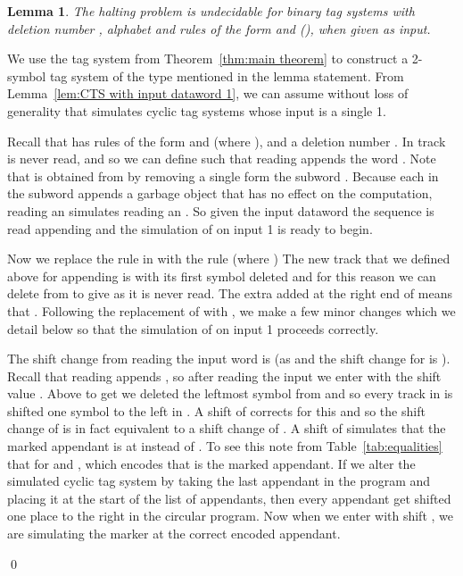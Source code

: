 \documentclass[11pt]{article} \usepackage{amsfonts,amsmath,amssymb,amsthm}
\renewenvironment{proof}{{\bfseries\noindent Proof.}}{\qed\vspace{3.5ex}}
\newtheorem{lemma}{Lemma}
\begin{document}
\begin{lemma}\label{lem:binary tag system for PCP}
The halting problem is undecidable for binary tag systems with deletion number , alphabet  and rules of the form  and  (), when given  as input.
\end{lemma}
\begin{proof}
We use the tag system  from Theorem~\ref{thm:main theorem} to construct a 2-symbol tag system  of the type mentioned in the lemma statement. From Lemma~\ref{lem:CTS with input dataword 1}, we can assume without loss of generality that  simulates cyclic tag systems whose input is a single 1.

Recall that  has rules of the form  and  (where ), and a deletion number . 
In  track  is never read, and so we can define  such that reading  appends the word . 
Note that  is obtained from  by removing a single  form the subword . 
Because each  in the subword  appends a garbage object that has no effect on the computation, reading an  simulates reading an . 
So given the input dataword  the sequence  is read appending  and the simulation of  on input 1 is ready to begin.

Now we replace the rule  in  with the rule  (where )
The new track that we defined above for appending  is  with its first symbol  deleted and for this reason we can delete  from  to give  as it is never read.
The extra  added at the right end of  means that . 
Following the replacement of  with , we make a few minor changes which we detail below so that the simulation of  on input 1 proceeds correctly.


The shift change from reading the input word  is  (as  and the shift change for  is ). 
Recall that reading  appends , so after reading the input  we enter  with the shift value .
Above to get  we deleted the leftmost symbol  from  and so every track in  is shifted one symbol to the left in . A shift of  corrects for this and so the shift change of  is in fact equivalent to a shift change of .
A shift of  simulates that the marked appendant is at  instead of . 
To see this note from Table~\ref{tab:equalities} that  for  and , which encodes that  is the marked appendant. 
If we alter the simulated cyclic tag system by taking the last appendant in the program and placing it at the start of the list of appendants, then every appendant get shifted one place to the right in the circular program. 
Now when we enter  with shift , we are simulating the marker at the correct encoded appendant. 


\end{proof}
\end{document}

